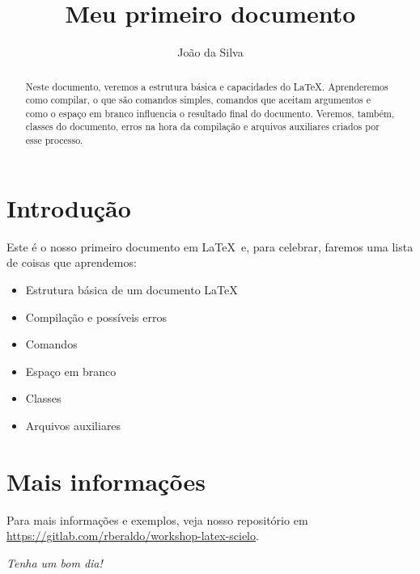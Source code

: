 \documentclass[11pt,a4paper,oneside]{article}
\title{Meu primeiro documento}
\author{João da Silva}
\begin{document}
\frenchspacing

\maketitle

\begin{abstract}
  Neste documento, veremos a estrutura básica e capacidades do \LaTeX.
  Aprenderemos como compilar, o que são comandos simples, comandos que aceitam
  argumentos e como o espaço em branco influencia o resultado final do
  documento. Veremos, também, classes do documento, erros na hora da compilação
  e arquivos auxiliares criados por esse processo.
\end{abstract}

\tableofcontents

\section{Introdução}

Este é o nosso primeiro documento em \LaTeX\ e, para celebrar, faremos uma
lista de coisas que aprendemos:

\begin{itemize}
  \item Estrutura básica de um documento \LaTeX
  \item Compilação e possíveis erros
  \item Comandos
  \item Espaço em branco
  \item Classes
  \item Arquivos auxiliares
\end{itemize}

\section{Mais informações}

Para mais informações e exemplos, veja nosso repositório em
\url{https://gitlab.com/rberaldo/workshop-latex-scielo}.

\begin{center}
  \textit{Tenha um bom dia!}
\end{center}
\end{document}

